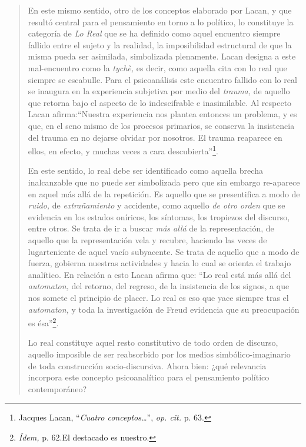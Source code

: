 \begin{quote}
En este mismo sentido, otro de los conceptos elaborado por Lacan, y que resultó central para el pensamiento en torno a lo político, lo constituye la categoría de \emph{Lo Real} que se ha definido como aquel encuentro siempre fallido entre el sujeto y la realidad, la imposibilidad estructural de que la misma pueda ser asimilada, simbolizada plenamente. Lacan designa a este mal-encuentro como la \emph{tychè,} es decir, como aquella cita con lo real que siempre se escabulle. Para el psicoanálisis este encuentro fallido con lo real se inaugura en la experiencia subjetiva por medio del \emph{trauma,} de aquello que retorna bajo el aspecto de lo indescifrable e inasimilable. Al respecto Lacan afirma:\enquote{Nuestra experiencia nos plantea entonces un problema, y es que, en el seno mismo de los procesos primarios, se conserva la insistencia del trauma en no dejarse olvidar por nosotros. El trauma reaparece en ellos, en efecto, y muchas veces a cara descubierta}\footnote{Jacques Lacan, \enquote{\emph{Cuatro conceptos\ldots{}}}, \emph{op. cit.} p. 63.}.

En este sentido, lo real debe ser identificado como aquella brecha inalcanzable que no puede ser simbolizada pero que sin embargo re-aparece en aquel más allá de la repetición. Es aquello que se presentifica a modo de \emph{ruido,} de \emph{extrañamiento} y accidente, como aquello \emph{de otro orden} que se evidencia en los estados oníricos, los síntomas, los tropiezos del discurso, entre otros. Se trata de ir a buscar \emph{más allá} de la representación, de aquello que la representación vela y recubre, haciendo las veces de lugarteniente de aquel vacío subyacente. Se trata de aquello que a modo de fuerza, gobierna nuestras actividades y hacia lo cual se orienta el trabajo analítico. En relación a esto Lacan afirma que: \enquote{Lo real está más allá del \emph{automaton,} del retorno, del regreso, de la insistencia de los signos, a que nos somete el principio de placer. Lo real es eso que yace siempre tras el \emph{automaton,} y toda la investigación de Freud evidencia que su preocupación es ésa}\footnote{\emph{Ídem,} p. 62.El destacado es nuestro.}.

Lo real constituye aquel resto constitutivo de todo orden de discurso, aquello imposible de ser reabsorbido por los medios simbólico-imaginario de toda construcción socio-discursiva. Ahora bien: ¿qué relevancia incorpora este concepto psicoanalítico para el pensamiento político contemporáneo?


\end{quote}
